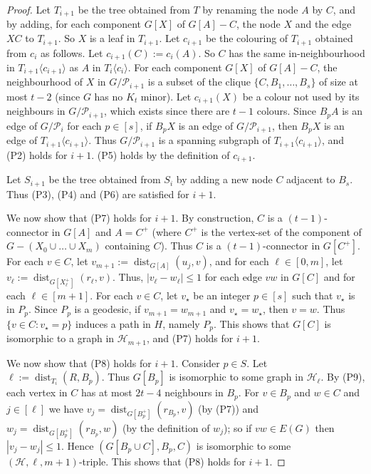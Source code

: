 \documentclass[a4paper,11pt]{article}
\theoremstyle{plain}
\theoremstyle{definition}
\renewcommand{\leq}{\leqslant}
\DeclareMathOperator{\dist}{dist}
\newcommand{\HH}{\mathcal{H}}
\newcommand{\PART}{\mathcal{P}}
\newcommand{\GGG}[2]{#1\langle{#2}\rangle}
\begin{document}
\begin{proof}
Let $T_{i+1}$ be the tree obtained from $T$ by renaming the node $A$ by $C$, and by adding, for each component $G[X]$ of $G[A]-C$, the node $X$ and the edge $XC$ to $T_{i+1}$. So $X$ is a leaf in $T_{i+1}$. Let $c_{i+1}$ be the colouring of $T_{i+1}$ obtained from $c_i$ as follows. 
Let $c_{i+1}(C):=c_i(A)$. 
So $C$ has the same in-neighbourhood in $\GGG{T_{i+1}}{c_{i+1}}$ as $A$ in $\GGG{T_i}{c_i}$.
For each component $G[X]$ of $G[A]-C$, the neighbourhood of $X$ in $G/\PART_{i+1}$ is a subset of the clique $\{C,B_1,\dots,B_s\}$ of size at most $t-2$ (since $G$ has no $K_t$ minor). 
Let $c_{i+1}(X)$ be a colour not used by its neighbours in $G/\PART_{i+1}$, which exists since there are $t-1$ colours. 
Since $B_pA$ is an edge of $G/\PART_i$ for each $p\in[s]$, 
if $B_pX$ is an edge of $G/\PART_{i+1}$, then $B_pX$ is an edge of $\GGG{T_{i+1}}{c_{i+1}}$. 
Thus $G/\PART_{i+1}$ is a spanning subgraph of $\GGG{T_{i+1}}{c_{i+1}}$, and (P2) holds for $i+1$. (P5) holds by the definition of $c_{i+1}$. 

Let $S_{i+1}$ be the tree obtained from $S_i$ by adding a new node $C$ adjacent to $B_s$. Thus (P3), (P4) and (P6) are satisfied for $i+1$. 

We now show that (P7) holds for $i+1$. By construction, $C$ is a $(t-1)$-connector in $G[A]$ and $A=C^+$ (where $C^+$ is the vertex-set of the component of $G-(X_0\cup\dots\cup X_m)$ containing $C$). Thus $C$ is a $(t-1)$-connector in $G[C^+]$. For each $v\in C$, let $v_{m+1}:=\dist_{G[A]}(u_j,v)$, and for each $\ell\in[0,m]$, let $v_\ell:=\dist_{G[X^+_\ell]}(r_\ell,v)$. Thus, $|v_\ell-w_\ell|\leq 1$ for each edge $vw$ in $G[C]$ and for each $\ell\in[m+1]$. For each $v\in C$, let $v_\star$ be an integer $p\in[s]$ such that $v_\star$ is in $P_p$. Since $P_p$ is a geodesic, if $v_{m+1}=w_{m+1}$ and $v_\star=w_\star$, then $v=w$. Thus $\{v\in C: v_\star = p \}$ induces a path in $H$, namely $P_p$. This shows that $G[C]$ is isomorphic to a graph in $\HH_{m+1}$, and (P7) holds for $i+1$.

We now show that (P8) holds for $i+1$. Consider $p\in S$. Let $\ell:=\dist_{T_i}(R,B_p)$. Thus $G[B_p]$ is isomorphic to some graph in $\HH_\ell$. By (P9), each vertex in $C$ has at most $2t-4$ neighbours in $B_p$. 
For $v\in B_p$ and $w\in C$ and $j\in[\ell]$ 
we have $v_j=\dist_{G[B^+_p]}(r_{B_p},v)$ (by (P7)) and
$w_j=\dist_{G[B^+_p]}(r_{B_p},w)$ (by the definition of $w_j$); 
so if $vw\in E(G)$ then $|v_j-w_j|\leq 1$. Hence $(G[B_p\cup C],B_p,C)$ is isomorphic to some $(\HH,\ell,m+1)$-triple. This shows that (P8) holds for $i+1$. 


\end{proof}
\end{document}
